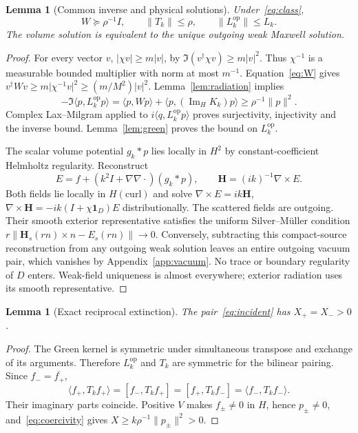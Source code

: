 \documentclass[11pt]{article}
\newtheorem{lemma}[theorem]{Lemma}
\newcommand{\ImH}{\operatorname{Im}_{\!H}}
\newcommand{\ip}[2]{\langle #1,#2\rangle}
\newcommand{\bilin}[2]{[#1,#2]}
\newcommand{\norm}[1]{\lVert #1\rVert}
\newcommand{\abs}[1]{\lvert #1\rvert}
\begin{document}
\begin{lemma}[Common inverse and physical solutions]\label{lem:inverse}
Under~\eqref{eq:class},
\begin{equation}\label{eq:inverse-bounds}
 W\succeq\rho^{-1}I,\qquad \norm{T_k}\leq\rho,
 \qquad \norm{L_k^{\mathrm{op}}}\leq L_k.
\end{equation}
The volume solution is equivalent to the unique outgoing weak Maxwell solution.
\end{lemma}
\begin{proof}
For every vector $v$, $\abs{\chi v}\geq m\abs v$, by $\Im(v^\dagger\chi v)\geq m\abs v^2$. Thus $\chi^{-1}$ is a measurable bounded multiplier with norm at most $m^{-1}$. Equation~\eqref{eq:W} gives $v^\dagger Wv\geq m\abs{\chi^{-1}v}^2\geq(m/M^2)\abs v^2$. Lemma~\ref{lem:radiation} implies
\begin{equation}\label{eq:coercivity}
 -\Im\ip{p}{L_k^{\mathrm{op}}p}
 =\ip{p}{Wp}+\ip{p}{(\ImH K_k)p}\geq\rho^{-1}\norm p^2.
\end{equation}
Complex Lax--Milgram applied to $i\ip{q}{L_k^{\mathrm{op}}p}$ proves surjectivity, injectivity and the inverse bound. Lemma~\ref{lem:green} proves the bound on $L_k^{\mathrm{op}}$.

The scalar volume potential $g_k*p$ lies locally in $H^2$ by constant-coefficient Helmholtz regularity. Reconstruct
\[
 E=f+(k^2I+\nabla\nabla\cdot)(g_k*p),\qquad
 \mathbf H=(ik)^{-1}\nabla\times E.
\]
Both fields lie locally in $H(\mathrm{curl})$ and solve $\nabla\times E=ik\mathbf H$, $\nabla\times\mathbf H=-ik(I+\chi\mathbf1_D)E$ distributionally. The scattered fields are outgoing. Their smooth exterior representative satisfies the uniform Silver--M\"uller condition $r\norm{\mathbf H_s(rn)\times n-E_s(rn)}\to0$. Conversely, subtracting this compact-source reconstruction from any outgoing weak solution leaves an entire outgoing vacuum pair, which vanishes by Appendix~\ref{app:vacuum}. No trace or boundary regularity of $D$ enters. Weak-field uniqueness is almost everywhere; exterior radiation uses its smooth representative.
\end{proof}

\begin{lemma}[Exact reciprocal extinction]\label{lem:reciprocity}
The pair~\eqref{eq:incident} has $X_+=X_->0$.
\end{lemma}
\begin{proof}
The Green kernel is symmetric under simultaneous transpose and exchange of its arguments. Therefore $L_k^{\mathrm{op}}$ and $T_k$ are symmetric for the bilinear pairing. Since $f_- =\overline{f_+}$,
\[
 \ip{f_+}{T_kf_+}=\bilin{f_-}{T_kf_+}
  =\bilin{f_+}{T_kf_-}=\ip{f_-}{T_kf_-}.
\]
Their imaginary parts coincide. Positive $V$ makes $f_\pm\ne0$ in $H$, hence $p_\pm\ne0$, and~\eqref{eq:coercivity} gives $X\geq k\rho^{-1}\norm{p_\pm}^2>0$.
\end{proof}
\end{document}
